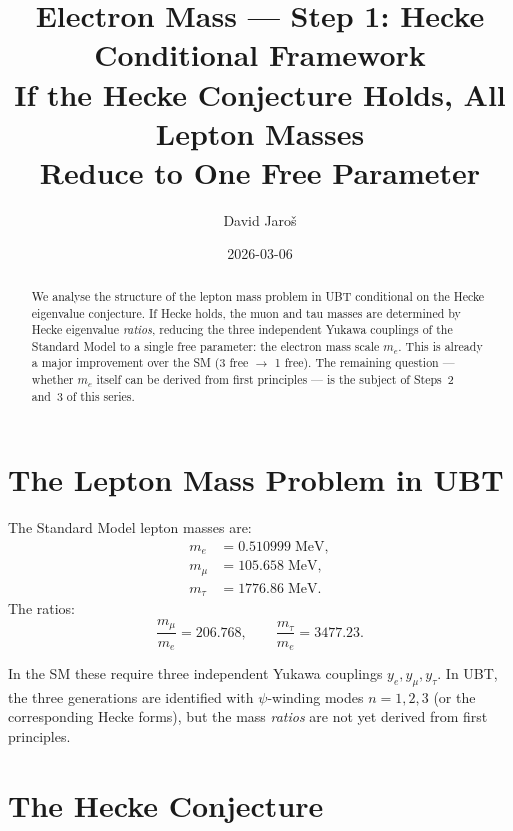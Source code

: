 \documentclass[12pt,a4paper]{article}
\title{\textbf{Electron Mass --- Step 1: Hecke Conditional Framework}\\
         \large If the Hecke Conjecture Holds, All Lepton Masses\\
         Reduce to One Free Parameter}
\author{David Jaro\v{s}}
\date{2026-03-06}
\theoremstyle{definition}
\theoremstyle{remark}
\begin{document}
  \maketitle

  \begin{abstract}
  We analyse the structure of the lepton mass problem in UBT conditional
  on the Hecke eigenvalue conjecture.  If Hecke holds, the muon and tau
  masses are determined by Hecke eigenvalue \emph{ratios}, reducing the
  three independent Yukawa couplings of the Standard Model to a single
  free parameter: the electron mass scale $m_e$.
  This is already a major improvement over the SM (3 free $\to$ 1 free).
  The remaining question --- whether $m_e$ itself can be derived from
  first principles --- is the subject of Steps~2 and~3 of this series.
  \end{abstract}
\fi

\section{The Lepton Mass Problem in UBT}
\label{sec:setup}

The Standard Model lepton masses are:
\begin{align}
  m_e &= 0.510999\;\mathrm{MeV}, \\
  m_\mu &= 105.658\;\mathrm{MeV}, \\
  m_\tau &= 1776.86\;\mathrm{MeV}.
\end{align}
The ratios:
\begin{equation}
  \frac{m_\mu}{m_e} = 206.768, \qquad
  \frac{m_\tau}{m_e} = 3477.23.
\end{equation}

In the SM these require three independent Yukawa couplings $y_e, y_\mu, y_\tau$.
In UBT, the three generations are identified with $\psi$-winding modes
$n = 1, 2, 3$ (or the corresponding Hecke forms), but the mass
\emph{ratios} are not yet derived from first principles.

\section{The Hecke Conjecture}
\label{sec:hecke}
\end{document}
